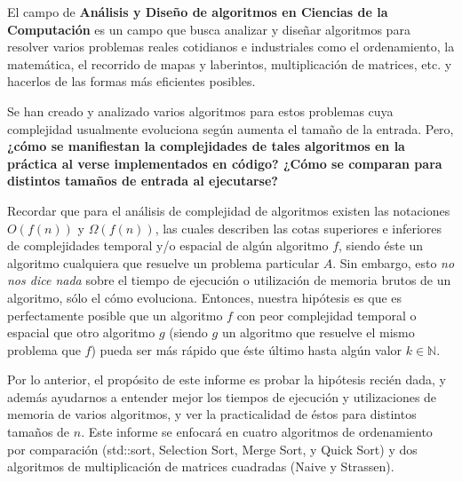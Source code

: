 El campo de \textbf{Análisis y Diseño de algoritmos en Ciencias de la Computación} es un campo que busca analizar y diseñar algoritmos para resolver varios problemas reales cotidianos e industriales como el ordenamiento, la matemática, el recorrido de mapas y laberintos, multiplicación de matrices, etc. y hacerlos de las formas más eficientes posibles.

Se han creado y analizado varios algoritmos para estos problemas cuya complejidad usualmente evoluciona según aumenta el tamaño de la entrada. Pero, \textbf{¿cómo se manifiestan la complejidades de tales algoritmos en la práctica al verse implementados en código? ¿Cómo se comparan para distintos tamaños de entrada al ejecutarse?}

Recordar que para el análisis de complejidad de algoritmos existen las notaciones $O(f(n))$ y $\Omega(f(n))$, las cuales describen las cotas superiores e inferiores de complejidades temporal y/o espacial de algún algoritmo $f$, siendo éste un algoritmo cualquiera que resuelve un problema particular $A$. Sin embargo, esto \textit{no nos dice nada} sobre el tiempo de ejecución o utilización de memoria brutos de un algoritmo, sólo el cómo evoluciona. Entonces, nuestra hipótesis es que es perfectamente posible que un algoritmo $f$ con peor complejidad temporal o espacial que otro algoritmo $g$ (siendo $g$ un algoritmo que resuelve el mismo problema que $f$) pueda ser más rápido que éste último hasta algún valor $k \in \mathbb{N}$.

Por lo anterior, el propósito de este informe es probar la hipótesis recién dada, y además ayudarnos a entender mejor los tiempos de ejecución y utilizaciones de memoria de varios algoritmos, y ver la practicalidad de éstos para distintos tamaños de $n$. Este informe se enfocará en cuatro algoritmos de ordenamiento por comparación (std::sort, Selection Sort, Merge Sort, y Quick Sort) y dos algoritmos de multiplicación de matrices cuadradas (Naive y Strassen).
